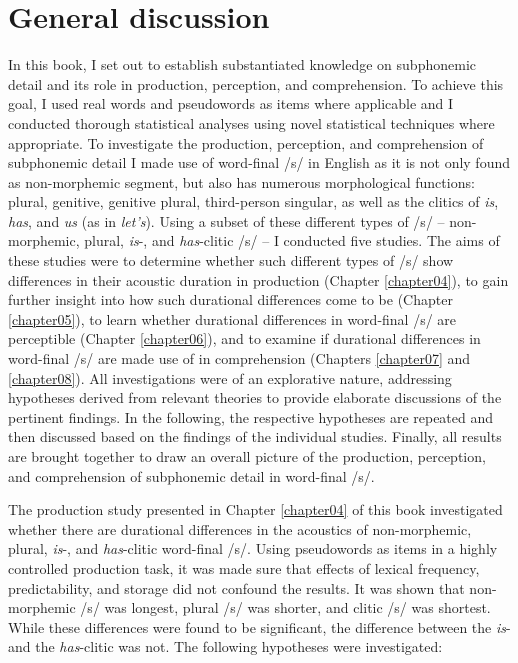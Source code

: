 \chapter{General discussion}\label{chapter09}

In this book, I set out to establish substantiated knowledge on subphonemic detail and its role in production, perception, and comprehension. To achieve this goal, I used real words and pseudowords as items where applicable and I conducted thorough statistical analyses using novel statistical techniques where appropriate. To investigate the production, perception, and comprehension of subphonemic detail I made use of word-final /s/ in English as it is not only found as non-morphemic segment, but also has numerous morphological functions: plural, genitive, genitive plural, third-person singular, as well as the clitics of \textit{is}, \textit{has}, and \textit{us} (as in \textit{let’s}). Using a subset of these different types of /s/ – non-morphemic, plural, \textit{is}-, and \textit{has}-clitic /s/ – I conducted five studies. The aims of these studies were to determine whether such different types of /s/ show differences in their acoustic duration in production (Chapter \ref{chapter04}), to gain further insight into how such durational differences come to be (Chapter \ref{chapter05}), to learn whether durational differences in word-final /s/ are perceptible (Chapter \ref{chapter06}), and to examine if durational differences in word-final /s/ are made use of in comprehension (Chapters \ref{chapter07} and \ref{chapter08}). All investigations were of an explorative nature, addressing hypotheses derived from relevant theories to provide elaborate discussions of the pertinent findings. In the following, the respective hypotheses are repeated and then discussed based on the findings of the individual studies. Finally, all results are brought together to draw an overall picture of the production, perception, and comprehension of subphonemic detail in word-final /s/.

The production study presented in Chapter \ref{chapter04} of this book investigated whether there are durational differences in the acoustics of non-morphemic, plural, \textit{is}-, and \textit{has}-clitic word-final /s/. Using pseudowords as items in a highly controlled production task, it was made sure that effects of lexical frequency, predictability, and storage did not confound the results. It was shown that non-morphemic /s/ was longest, plural /s/ was shorter, and clitic /s/ was shortest. While these differences were found to be significant, the difference between the \textit{is}- and the \textit{has}-clitic was not. The following hypotheses were investigated:

